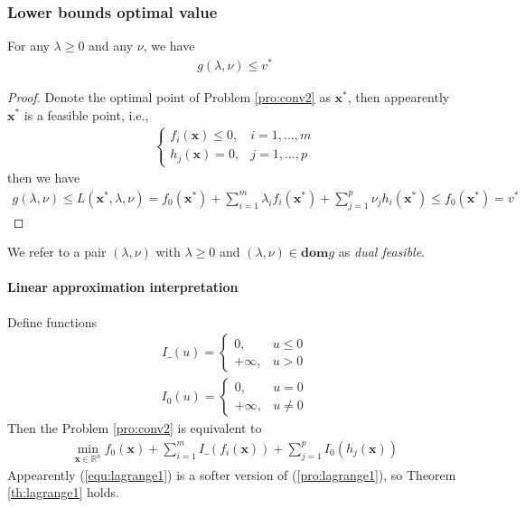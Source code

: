 \subsubsection{Lower bounds optimal value}
\begin{theorem}
    For any $\lambda \geq 0$ and any $\nu$, we have
    \begin{align}
        g(\lambda, \nu) \leq v^*
    \end{align}
    \label{th:lagrange1}
\end{theorem}
\begin{proof}
    Denote the optimal point of Problem \ref{pro:conv2}
    as $\mathbf{x}^*$, then appearently $\mathbf{x}^*$
    is a feasible point, i.e.,
    \begin{align}
        \left\{
            \begin{array}{ll}
                f_i (\mathbf{x}) \leq 0, &i = 1,..., m \\
                h_j (\mathbf{x}) = 0, &j = 1,..., p
            \end{array}
            \right.
    \end{align}
    then we have
    \begin{align}
        g(\lambda, \nu) \leq
        L(\mathbf{x}^*, \lambda, \nu) = 
        f_0(\mathbf{x}^*) +
        \sum_{i=1}^m \lambda_i f_i(\mathbf{x}^*) +
        \sum_{j=1}^p \nu_j h_i(\mathbf{x}^*) \leq f_0(\mathbf{x}^*)
        = v^*
    \end{align}
\end{proof}
We refer to a pair $(\lambda, \nu)$ with $\lambda \geq 0$
and $(\lambda, \nu) \in \mathbf{dom}g$ as
\emph{dual feasible}.

\paragraph{Linear approximation interpretation}
Define functions
\begin{align}
    I\_ (u) = \left\{
        \begin{array}{ll}
            0, &u \leq 0 \\
            + \infty, &u > 0
        \end{array}
        \right.
\end{align}
\begin{align}
    I_0 (u) = \left\{
        \begin{array}{ll}
            0, &u = 0 \\
            + \infty, &u \neq 0
        \end{array}
        \right.
\end{align}
Then the Problem \ref{pro:conv2} is equivalent to
\begin{align}
    \min_{\mathbf{x} \in \mathbb{R}^n}
    f_0(\mathbf{x}) + \sum_{i=1}^m I\_(f_i(\mathbf{x}))
    + \sum_{j=1}^p I_0(h_j(\mathbf{x}))
    \label{pro:lagrange1}
\end{align}
Appearently (\ref{equ:lagrange1}) is a softer
version of (\ref{pro:lagrange1}),
so Theorem \ref{th:lagrange1} holds.

